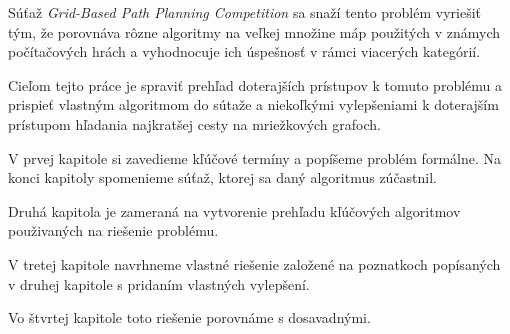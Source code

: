 Súťaž {\sl Grid-Based Path Planning Competition}
 \cite{sturtevantgppc} sa snaží tento problém vyriešiť tým, že porovnáva rôzne algoritmy na veľkej množine máp
použitých v známych počítačových hrách a vyhodnocuje ich úspešnosť v rámci viacerých kategórií.

Cieľom tejto práce je spraviť prehľad doterajších prístupov k tomuto problému a prispieť vlastným algoritmom do sútaže a niekoľkými vylepšeniami k doterajším prístupom hľadania najkratšej cesty na mriežkových grafoch.

V prvej kapitole si zavedieme kľúčové termíny a popíšeme problém formálne. Na konci kapitoly spomenieme súťaž, ktorej sa daný algoritmus zúčastnil.

Druhá kapitola je zameraná na vytvorenie prehľadu kľúčových algoritmov použivaných na riešenie problému.

V tretej kapitole navrhneme vlastné riešenie založené na poznatkoch popísaných v druhej kapitole s pridaním vlastných vylepšení.

Vo štvrtej kapitole toto riešenie porovnáme s dosavadnými.


